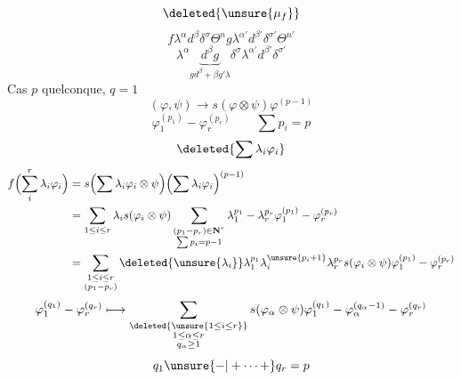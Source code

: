 \[
\deleted{\unsure{\mu_f}}
\]
\[
f\lambda^\alpha d^\beta\delta^\sigma\Theta^n
g\lambda^{\alpha'}d^{\beta'}\delta^{\sigma'}\Theta^{n'}
\]
\[
\lambda^\alpha\underbrace{d^\beta g}_{g d^\beta+\beta g'\lambda}
\delta^\sigma\lambda^{\alpha'}d^{\beta'}\delta^{\sigma'}
\]
Cas $p$ quelconque, $q=1$
\[
(\varphi,\psi)\longrightarrow s(\varphi\otimes\psi)\varphi^{(p-1)}
\]
\[
\varphi_1^{(p_1)}-\varphi_r^{(p_r)}\qquad\sum p_i=p
\]
\[
\deleted{\sum\lambda_i\varphi_i}
\]
\[
\begin{aligned}
f\Bigl(\sum_i^r\lambda_i\varphi_i\Bigr)
&=s\Bigl(\sum\lambda_i\varphi_i\otimes\psi\Bigr)
\Bigl(\sum\lambda_i\varphi_i\Bigr)^{(p-1)}\\
&=\sum_{1\le i\le r}\lambda_i s(\varphi_i\otimes\psi)
\sum_{\substack{(p_1-p_r)\in\mathbf N^r\\\sum p_i=p-1}}
\lambda_1^{p_1}-\lambda_r^{p_r}\varphi_1^{(p_1)}-\varphi_r^{(p_r)}\\
&=\sum_{\substack{1\le i\le r\\(p_1-p_r)}}
\deleted{\unsure{\lambda_i}}\lambda_1^{p_1}\lambda_i^{\unsure{p_i+1}}\lambda_r^{p_r}
s(\varphi_i\otimes\psi)\varphi_1^{(p_1)}-\varphi_r^{(p_r)}
\end{aligned}
\]
\[
\varphi_1^{(q_1)}-\varphi_r^{(q_r)}\longmapsto
\sum_{\substack{\deleted{\unsure{1\le i\le r}}\\1\le\alpha\le r\\q_\alpha\ge1}}
s(\varphi_\alpha\otimes\psi)\varphi_1^{(q_1)}-
\varphi_\alpha^{(q_\alpha-1)}-\varphi_r^{(q_r)}
\]
\[
q_1\unsure{-|+\cdots+}q_r=p
\]
\diagram{\begin{tikzcd}[row sep=large]
\Gamma^2\Phi_*\otimes\Psi_*\arrow[d,bend left=35,"?"]\\
\Gamma^2\Phi_*\otimes\Phi_*\arrow[u]\\
\Gamma^2\Phi_*\arrow[u]\\
0\arrow[u]
\end{tikzcd}}

